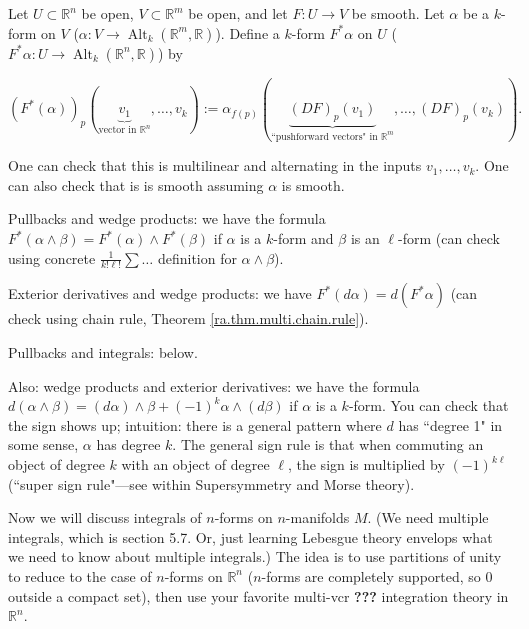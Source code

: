 \begin{definition}\label{ra.def.pullbacks.gen}

Let \(U \subset \mathbb{R}^n\) be open, \(V \subset \mathbb{R}^m\) be open, and let \(F: U \to V\) be smooth. Let \(\alpha\) be a \(k\)-form on \(V\) (\(\alpha: V \to \operatorname{Alt}_k(\mathbb{R}^m, \mathbb{R})\)). Define a \(k\)-form \(F^* \alpha\) on \(U\) (\(F^*\alpha: U \to \operatorname{Alt}_k(\mathbb{R}^n, \mathbb{R})\)) by

\[
(F^*(\alpha))_p(\underbrace{v_1}_{\text{vector in \(\mathbb{R}^n\)}}, \ldots, v_k) := \alpha_{f(p)} (\underbrace{(DF)_p(v_1)}_{\text{``pushforward vectors" in } \mathbb{R}^m}, \ldots, (DF)_p(v_k)).
\]

One can check that this is multilinear and alternating in the inputs \(v_1, \ldots, v_k\). One can also check that is is smooth assuming \(\alpha\) is smooth. 

\end{definition}

Pullbacks and wedge products: we have the formula \(F^*(\alpha \wedge \beta) = F^*(\alpha) \wedge F^*(\beta)\) if \(\alpha\) is a \(k\)-form and \(\beta\) is an \(\ell\)-form (can check using concrete \(\frac{1}{k! \ell!} \sum \ldots\) definition for \(\alpha \wedge \beta\)).

Exterior derivatives and wedge products: we have \(F^*(d \alpha) = d(F^* \alpha)\) (can check using chain rule, Theorem \ref{ra.thm.multi.chain.rule}).

Pullbacks and integrals: below.

Also: wedge products and exterior derivatives: we have the formula \(d(\alpha \wedge \beta) = (d \alpha) \wedge \beta + (-1)^k \alpha \wedge (d \beta)\) if \(\alpha\) is a \(k\)-form. You can check that the sign shows up; intuition: there is a general pattern where \(d\) has ``degree 1" in some sense, \(\alpha\) has degree \(k\). The general sign rule is that when commuting an object of degree \(k\) with an object of degree \(\ell\), the sign is multiplied by \((-1)^{k \ell}\) (``super sign rule"---see within Supersymmetry and Morse theory). 

Now we will discuss integrals of \(n\)-forms on \(n\)-manifolds \(M\). (We need multiple integrals, which is \citet{pugh2015real} section 5.7. Or, just learning Lebesgue theory envelops what we need to know about multiple integrals.) The idea is to use partitions of unity to reduce to the case of \(n\)-forms on \(\mathbb{R}^n\) (\(n\)-forms are completely supported, so 0 outside a compact set), then use your favorite multi-vcr \textbf{???} integration theory in \(\mathbb{R}^n\). 

